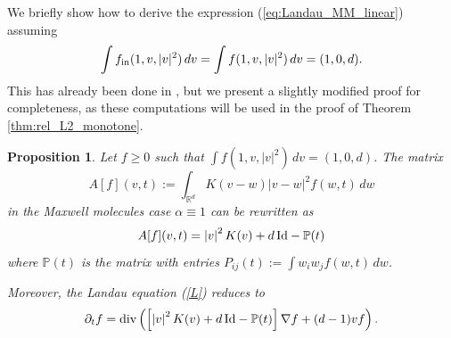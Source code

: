 \documentclass[11pt]{amsart}
\numberwithin{equation}{section}
\newtheorem{proposition}{Proposition}
\begin{document}
We briefly show how to derive the expression (\ref{eq:Landau_MM_linear}) assuming 
$$\int f_{\textnormal{in}}(1,v,|v|^2)\,dv =\int f(1,v,|v|^2)\,dv =(1,0,d).$$ This has already been done in \cite{desvillettes_villani2000landau_hard}, but we present a slightly modified proof for completeness, as these computations will be used in the proof of Theorem \ref{thm:rel_L2_monotone}.
% 
\begin{proposition}
Let $f\ge 0$ such that $\int f(1,v,|v|^2)\,dv =(1,0,d)$.     The matrix 
  $$A[f](v,t):=\int_{\mathbb{R}^{d}}{K(v-w)}{\vert{v-w}\vert^{2}}f(w,t)\,dw$$
  in the Maxwell molecules case $ \alpha \equiv 1$ can be rewritten as 
  $$A[f](v,t)=\left\vert v \right\vert ^{2}K(v)+d\,\textnormal{Id} - \mathbb{P}(t)$$
   where $\mathbb{P}(t)$ is the matrix with entries $P_{ij}(t):=\int w_iw_jf(w,t)\,dw$. 
   
   Moreover, the Landau equation (\ref{L}) reduces to
  \begin{equation}\label{eq:Landau_max_mol}
    \partial_t f = \textnormal{div}\left( 
      \left[ \left\vert v \right\vert ^{2}K(v) + d\, \textnormal{Id}  - \mathbb{P}(t) \right]\nabla f
      + (d-1)vf
     \right).
  \end{equation}
\end{proposition}
\end{document}
